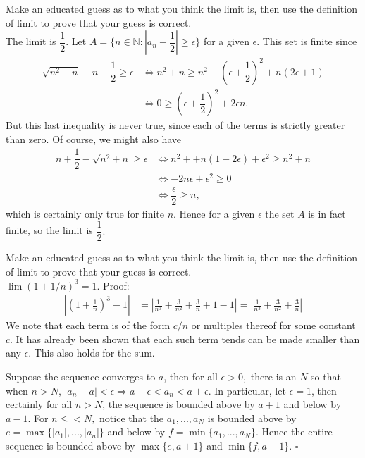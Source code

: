 \documentclass[12pt]{book}
\newenvironment{exercise}[2][Exercise]{\begin{trivlist}
\item[\hskip \labelsep {\bfseries #1}\hskip \labelsep {\bfseries #2.}]}{\end{trivlist}}
\begin{document}
\begin{exercise}{2.2.5}
Make an educated guess as to what you think the limit is, then use the definition of limit to prove that your guess is correct.\\

The limit is $\dfrac{1}{2}$. Let $A = \{ n \in \mathbb{N} : |a_n - \dfrac{1}{2}| \geq \epsilon\}$ for a given $\epsilon.$ This set is finite since \begin{align*}
\sqrt{n^2 + n} - n - \dfrac{1}{2} \geq \epsilon & \Leftrightarrow n^2 + n \geq n^2 + \left(\epsilon + \dfrac{1}{2}\right)^2 + n(2\epsilon + 1) \\
& \Leftrightarrow 0 \geq \left( \epsilon + \dfrac{1}{2} \right)^2 + 2 \epsilon n. \end{align*}
But this last inequality is never true, since each of the terms is strictly greater than zero. Of course, we might also have
\begin{align*}
n+\dfrac{1}{2} - \sqrt{n^2 + n} \geq \epsilon & \Leftrightarrow n^2 + +n(1-2\epsilon) + \epsilon^2 \geq n^2 + n \\
& \Leftrightarrow -2n\epsilon + \epsilon^2 \geq 0 \\
& \Leftrightarrow \dfrac{\epsilon}{2} \geq n,
\end{align*}
which is certainly only true for finite $n$. Hence for a given $\epsilon$ the set $A$ is in fact finite, so the limit is $\dfrac{1}{2}.$
\end{exercise}


\begin{exercise}{2.2.6}
Make an educated guess as to what you think the limit is, then use the definition of limit to prove that your guess is correct.\\

$\lim (1 + 1/n)^3 = 1$. Proof:
	\begin{align*}
		| (1+ \frac{1}{n})^3 -1 | &= | \frac{1}{n^3} + \frac{3}{n^2}+ \frac{3}{n} + 1 - 1| = | \frac{1}{n^3} + \frac{3}{n^2}+ \frac{3}{n} |
		\end{align*}
We note that each term is of the form $c/n$ or multiples thereof for some constant $c$. It has already been shown that each such term tends can be made smaller than any $\epsilon$. This also holds for the sum.
\end{exercise}

\begin{exercise}{2.2.7}
Suppose the sequence converges to $a$, then for all $\epsilon > 0,$ there is an $N$ so that when $n > N$, $|a_n - a| < \epsilon \Rightarrow a- \epsilon < a_n < a+\epsilon.$ In particular, let $\epsilon = 1$, then certainly for all $n > N$, the sequence is bounded above by $a+1$ and below by $a-1$. For $n \leq < N,$ notice that the $a_1, ..., a_N$ is bounded above by $e = \max \{|a_1|, ..., |a_n|\}$ and below by $f = \min \{a_1, ..., a_N\}.$ Hence the entire sequence is bounded above by $\max \{e, a+1\}$ and $\min \{f, a-1\}.$ $\square$
\end{exercise}
\end{document}
